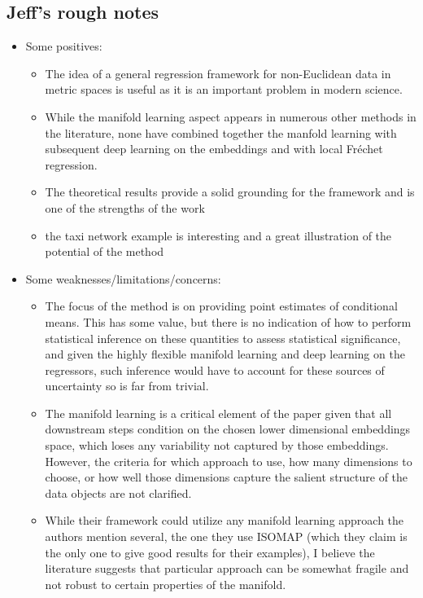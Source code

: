 \subsection*{Jeff's rough notes}

\begin{itemize}
    \item Some positives:
    \begin{itemize}
        \item The idea of a general regression framework for non-Euclidean data in metric spaces is useful as it is an important problem in modern science.
        \item While the manifold learning aspect appears in numerous other methods in the literature, none have combined together the manfold learning with subsequent deep learning on the embeddings and with local Fr\'echet regression.
        \item The theoretical results provide a solid grounding for the framework and is one of the strengths of the work
        \item the taxi network example is interesting and a great illustration of the potential of the method
    \end{itemize}
    \item Some weaknesses/limitations/concerns:
    \begin{itemize}
        \item The focus of the method is on providing point estimates of conditional means.  This has some value, but there is no indication of how to perform statistical inference on these quantities to assess statistical significance, and given the highly flexible manifold learning and deep learning on the regressors, such inference would have to account for these sources of uncertainty so is far from trivial.
        \item The manifold learning is a critical element of the paper given that all downstream steps condition on the chosen lower dimensional embeddings space, which loses any variability not captured by those embeddings. However, the criteria for which approach to use, how many dimensions to choose, or how well those dimensions capture the salient structure of the data objects are not clarified.  
        \item While their framework could utilize any manifold learning approach the authors mention several, the one they use ISOMAP (which they claim is the only one to give good results for their examples), I believe the literature suggests that particular approach can be somewhat fragile and not robust to certain properties of the manifold.

\end{itemize}
\end{itemize}
